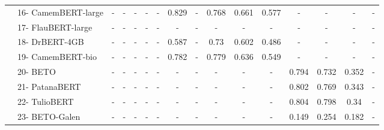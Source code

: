 {\begin{tabular}{ll|ccccc|ccccc|cccc}
 & 16- CamemBERT-large & - & - & - & - & - & 0.829 & - & 0.768 & 0.661 & 0.577 & - & - & - & - \\
 & 17- FlauBERT-large & - & - & - & - & - & - & - & - & - & - & - & - & - & - \\
 & 18- DrBERT-4GB & - & - & - & - & - & 0.587 & - & 0.73 & 0.602 & 0.486 & - & - & - & - \\
 & 19- CamemBERT-bio & - & - & - & - & - & 0.782 & - & 0.779 & 0.636 & 0.549 & - & - & - & - \\
 & 20- BETO & - & - & - & - & - & - & - & - & - & - & 0.794 & 0.732 & 0.352 & - \\
 & 21- PatanaBERT & - & - & - & - & - & - & - & - & - & - & 0.802 & 0.769 & 0.343 & - \\
 & 22- TulioBERT & - & - & - & - & - & - & - & - & - & - & 0.804 & 0.798 & 0.34 & - \\
 & 23- BETO-Galen & - & - & - & - & - & - & - & - & - & - & 0.149 & 0.254 & 0.182 & - \\
\bottomrule
\end{tabular}}